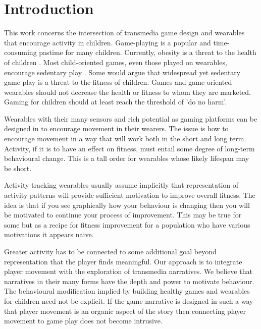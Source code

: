 \documentclass{SIGCHI2015LaTex/sigchi}
\begin{document}


\section{Introduction}
This work concerns the intersection of transmedia game design and wearables that encourage activity in children. Game-playing is a popular and time-consuming pastime for many children. Currently, obesity is a threat to the health of children \cite{ebbeling2002childhood}. Most child-oriented games, even those played on wearables, encourage sedentary play \cite{graves2008energy}. Some would argue that widespread yet sedentary game-play is a threat to the fitness of children. Games and game-oriented wearables should not decrease the health or fitness to whom they are marketed. Gaming for children should at least reach the threshold of 'do no harm'. 

Wearables with their many sensors and rich potential as gaming platforms can be designed in to encourage movement in their wearers. The issue is how to encourage movement in a way that will work both in the short and long term. Activity, if it is to have an effect on fitness, must entail some degree of long-term behavioural change. This is a tall order for wearables whose likely lifespan may be short. 

Activity tracking wearables usually assume implicitly that representation of activity patterns will provide sufficient motivation to improve overall fitness. The idea is that if you see graphically how your behaviour is changing then you will be motivated to continue your process of improvement. This may be true for some but as a recipe for fitness improvement for a population who have various motivations it appears naive. 

Greater activity has to be connected to some additional goal beyond representation that the player finds meaningful. Our approach is to integrate player movement with the exploration of transmedia narratives. We believe that narratives in their many forms have the depth and power to motivate behaviour. The behavioural modification implied by building healthy games and wearables for children need not be explicit. If the game narrative is designed in such a way that player movement is an organic aspect of the story then connecting player movement to game play does not become intrusive.
\end{document}
